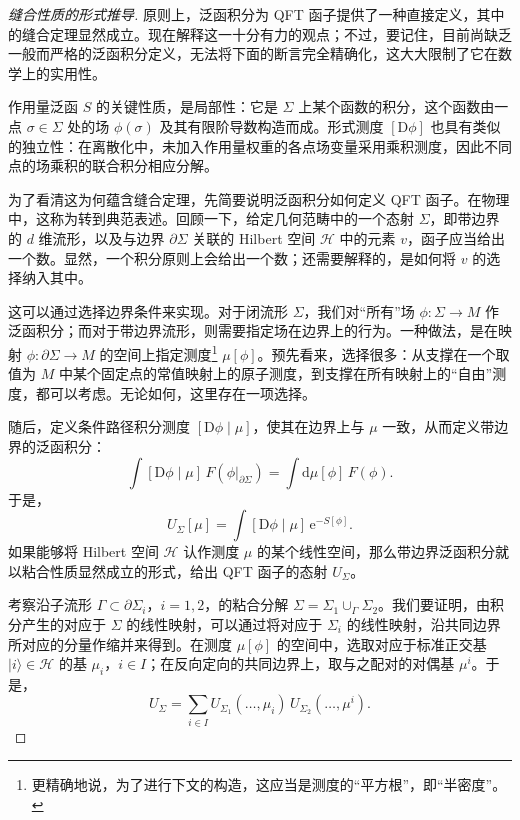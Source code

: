 \begin{proof}[缝合性质的形式推导]
原则上，泛函积分为 QFT 函子提供了一种直接定义，其中的缝合定理显然成立。现在解释这一十分有力的观点；不过，要记住，目前尚缺乏一般而严格的泛函积分定义，无法将下面的断言完全精确化，这大大限制了它在数学上的实用性。

作用量泛函 $S$ 的关键性质，是局部性：它是 $\Sigma$ 上某个函数的积分，这个函数由一点 $\sigma\in\Sigma$ 处的场 $\phi(\sigma)$ 及其有限阶导数构造而成。形式测度 $[\mathrm{D}\phi]$ 也具有类似的独立性：在离散化中，未加入作用量权重的各点场变量采用乘积测度，因此不同点的场乘积的联合积分相应分解。

为了看清这为何蕴含缝合定理，先简要说明泛函积分如何定义 QFT 函子。在物理中，这称为转到典范表述。回顾一下，给定几何范畴中的一个态射 $\Sigma$，即带边界的 $d$ 维流形，以及与边界 $\partial\Sigma$ 关联的 Hilbert 空间 $\mathcal{H}$ 中的元素 $v$，函子应当给出一个数。显然，一个积分原则上会给出一个数；还需要解释的，是如何将 $v$ 的选择纳入其中。

这可以通过选择边界条件来实现。对于闭流形 $\Sigma$，我们对“所有”场 $\phi\colon\Sigma\to M$ 作泛函积分；而对于带边界流形，则需要指定场在边界上的行为。一种做法，是在映射 $\phi\colon\partial\Sigma\to M$ 的空间上指定测度\footnote{更精确地说，为了进行下文的构造，这应当是测度的“平方根”，即“半密度”。} $\mu[\phi]$。预先看来，选择很多：从支撑在一个取值为 $M$ 中某个固定点的常值映射上的原子测度，到支撑在所有映射上的“自由”测度，都可以考虑。无论如何，这里存在一项选择。

随后，定义条件路径积分测度 $[\mathrm{D}\phi\mid\mu]$，使其在边界上与 $\mu$ 一致，从而定义带边界的泛函积分：
\[
\int[\mathrm{D}\phi\mid\mu]\,F(\phi|_{\partial\Sigma})
=\int\mathrm{d}\mu[\phi]\,F(\phi).
\]
于是，
\begin{equation}\label{eq:3.16}
U_\Sigma[\mu]=\int[\mathrm{D}\phi\mid\mu]\,\mathrm{e}^{-S[\phi]}.
\end{equation}
如果能够将 Hilbert 空间 $\mathcal{H}$ 认作测度 $\mu$ 的某个线性空间，那么带边界泛函积分就以粘合性质显然成立的形式，给出 QFT 函子的态射 $U_\Sigma$。

考察沿子流形 $\Gamma\subset\partial\Sigma_i$，$i=1,2$，的粘合分解 $\Sigma=\Sigma_1\cup_\Gamma\Sigma_2$。我们要证明，由积分产生的对应于 $\Sigma$ 的线性映射，可以通过将对应于 $\Sigma_i$ 的线性映射，沿共同边界所对应的分量作缩并来得到。在测度 $\mu[\phi]$ 的空间中，选取对应于标准正交基 $|i\rangle\in\mathcal{H}$ 的基 $\mu_i$，$i\in I$；在反向定向的共同边界上，取与之配对的对偶基 $\mu^i$。于是，
\begin{equation}\label{eq:3.17}
U_\Sigma=\sum_{i\in I}
U_{\Sigma_1}(\ldots,\mu_i)\,U_{\Sigma_2}(\ldots,\mu^i).
\end{equation}


\end{proof}
